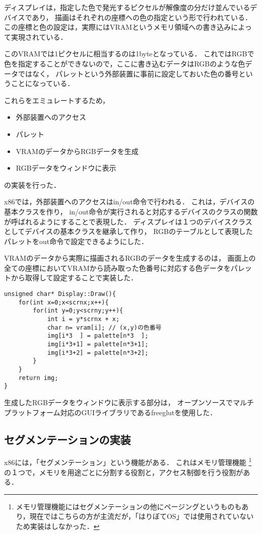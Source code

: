 \documentclass[10pt,a4j]{jsarticle}
\begin{document}
ディスプレイは，指定した色で発光するピクセルが解像度の分だけ並んでいるデバイスであり，
描画はそれぞれの座標への色の指定という形で行われている．
この座標と色の設定は，実際にはVRAMというメモリ領域への書き込みによって実現されている．

このVRAMでは1ピクセルに相当するのは1byteとなっている．
これではRGBで色を指定することができないので，ここに書き込むデータはRGBのような色データではなく，
パレットという外部装置に事前に設定しておいた色の番号ということになっている．

これらをエミュレートするため，
\begin{itemize}
	\item 外部装置へのアクセス
	\item パレット
	\item VRAMのデータからRGBデータを生成
	\item RGBデータをウィンドウに表示
\end{itemize}
の実装を行った．

x86では，外部装置へのアクセスはin/out命令で行われる．
これは，デバイスの基本クラスを作り，
in/out命令が実行されると対応するデバイスのクラスの関数が呼ばれるようにすることで表現した．
ディスプレイは１つのデバイスクラスとしてデバイスの基本クラスを継承して作り，
RGBのテーブルとして表現したパレットをout命令で設定できるようにした．

VRAMのデータから実際に描画されるRGBのデータを生成するのは，
画面上の全ての座標においてVRAMから読み取った色番号に対応する色データをパレットから取得して設定することで実装した．

\begin{lstlisting}
unsigned char* Display::Draw(){
	for(int x=0;x<scrnx;x++){
		for(int y=0;y<scrny;y++){
			int i = y*scrnx + x;
			char n= vram[i]; // (x,y)の色番号
			img[i*3  ] = palette[n*3  ];
			img[i*3+1] = palette[n*3+1];
			img[i*3+2] = palette[n*3+2];
		}
	}
	return img;
}
\end{lstlisting}

生成したRGBデータをウィンドウに表示する部分は，
オープンソースでマルチプラットフォーム対応のGUIライブラリであるfreeglutを使用した．

\subsection{セグメンテーションの実装\label{impl-segmentation}}

x86には，「セグメンテーション」という機能がある．
これはメモリ管理機能
\footnote{メモリ管理機能にはセグメンテーションの他にページングというものもあり，現在ではこちらの方が主流だが，「はりぼてOS」では使用されていないため実装はしなかった．}
の１つで，メモリを用途ごとに分割する役割と，アクセス制御を行う役割がある．
\end{document}
